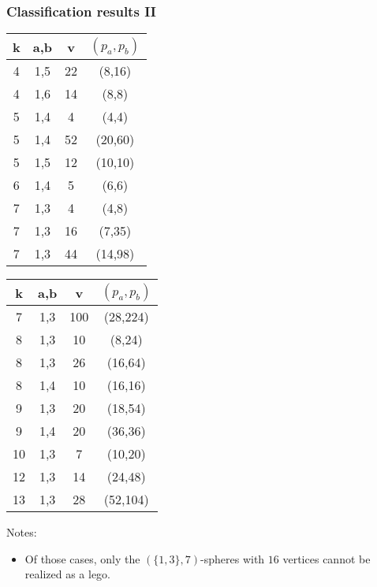 \documentclass{beamer}
\begin{document}
\begin{frame}
  \frametitle{Classification results II}

\begin{center}
\begin{minipage}[b]{5cm}
\begin{tabular}{||c|c|c|c||}
\hline\hline
  k & a,b  & v   &$(p_a,p_b)$\\
\hline\hline
  4 & 1,5  & 22  & (8,16)  \\
  4 & 1,6  & 14  & (8,8)   \\
  5 & 1,4  & 4   & (4,4)   \\
  5 & 1,4  & 52  & (20,60) \\
  5 & 1,5  & 12  & (10,10) \\
  6 & 1,4  & 5   & (6,6)   \\
  7 & 1,3  & 4   & (4,8)   \\
  7 & 1,3  & 16  & (7,35)  \\
  7 & 1,3  & 44  & (14,98) \\
\hline\hline
\end{tabular}
\end{minipage}
\begin{minipage}[b]{5cm}
\begin{tabular}{||c|c|c|c||}
\hline\hline
  k & a,b  & v   &$(p_a,p_b)$\\
\hline\hline
  7 & 1,3  & 100 & (28,224)\\
  8 & 1,3  & 10  & (8,24)  \\
  8 & 1,3  & 26  & (16,64) \\
  8 & 1,4  & 10  & (16,16) \\
  9 & 1,3  & 20  & (18,54) \\
  9 & 1,4  & 20  & (36,36) \\
 10 & 1,3  & 7   & (10,20) \\
 12 & 1,3  & 14  & (24,48) \\
 13 & 1,3  & 28  & (52,104)\\
\hline\hline
\end{tabular}
\end{minipage}

\end{center}
Notes:
\begin{itemize}
\item Of those cases, only the $(\{1,3\},7)$-spheres with $16$ vertices cannot be realized as a lego.
\end{itemize}

\end{frame}
\end{document}
